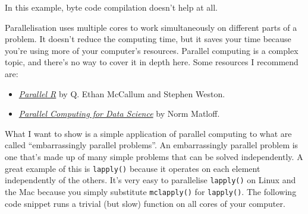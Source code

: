 \begin{Shaded}
\begin{Highlighting}[]
\StringTok{ }

\NormalTok{(}
   
\NormalTok{)}
\end{Highlighting}
\end{Shaded}

In this example, byte code compilation doesn't help at all.


Parallelisation uses multiple cores to work simultaneously on different
parts of a problem. It doesn't reduce the computing time, but it saves
your time because you're using more of your computer's resources.
Parallel computing is a complex topic, and there's no way to cover it in
depth here. Some resources I recommend are: 

\begin{itemize}
\item
  \href{http://amazon.com/B005Z29QT4}{\emph{Parallel R}} by Q. Ethan
  McCallum and Stephen Weston.
\item
  \href{http://heather.cs.ucdavis.edu/paralleldatasci.pdf}{\emph{Parallel
  Computing for Data Science}} by Norm Matloff.
\end{itemize}

What I want to show is a simple application of parallel computing to
what are called ``embarrassingly parallel problems''. An embarrassingly
parallel problem is one that's made up of many simple problems that can
be solved independently. A great example of this is \texttt{lapply()}
because it operates on each element independently of the others. It's
very easy to parallelise \texttt{lapply()} on Linux and the Mac because
you simply substitute \texttt{mclapply()} for \texttt{lapply()}. The
following code snippet runs a trivial (but slow) function on all cores
of your computer.

